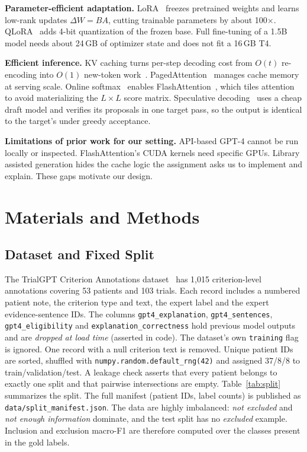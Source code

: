 \documentclass[conference]{IEEEtran}
\begin{document}
\textbf{Parameter-efficient adaptation.} LoRA~\cite{hu2022lora} freezes pretrained weights and learns
low-rank updates $\Delta W=BA$, cutting trainable parameters by about 100$\times$. QLoRA~\cite{dettmers2023qlora}
adds 4-bit quantization of the frozen base. Full fine-tuning of a 1.5B model needs about 24\,GB of optimizer
state and does not fit a 16\,GB T4.

\textbf{Efficient inference.} KV caching turns per-step decoding cost from $O(t)$ re-encoding into
$O(1)$ new-token work~\cite{pope2023efficiently}. PagedAttention~\cite{kwon2023vllm} manages cache memory at
serving scale. Online softmax~\cite{milakov2018online} enables FlashAttention~\cite{dao2022flashattention},
which tiles attention to avoid materializing the $L\times L$ score matrix. Speculative
decoding~\cite{leviathan2023fast,chen2023accelerating} uses a cheap draft model and verifies its proposals in one
target pass, so the output is identical to the target's under greedy acceptance.

\textbf{Limitations of prior work for our setting.} API-based GPT-4 cannot be run locally or
inspected. FlashAttention's CUDA kernels need specific GPUs. Library assisted generation hides the
cache logic the assignment asks us to implement and explain. These gaps motivate our design.

\section{Materials and Methods}
\subsection{Dataset and Fixed Split}
The TrialGPT Criterion Annotations dataset~\cite{jin2024trialgpt} has 1,015 criterion-level
annotations covering 53 patients and 103 trials. Each record includes a numbered patient note,
the criterion type and text, the expert label and the expert evidence-sentence IDs. The
columns \texttt{gpt4\_explanation}, \texttt{gpt4\_sentences}, \texttt{gpt4\_eligibility} and
\texttt{explanation\_correctness} hold previous model outputs and are \emph{dropped at load
time} (asserted in code). The dataset's own \texttt{training} flag is ignored. One record with a null
criterion text is removed. Unique patient IDs are sorted, shuffled with
\texttt{numpy.random.default\_rng(42)} and assigned 37/8/8 to train/validation/test. A leakage check
asserts that every patient belongs to exactly one split and that pairwise intersections are empty.
Table~\ref{tab:split} summarizes the split. The full manifest (patient IDs, label counts) is
published as \texttt{data/split\_manifest.json}. The data are highly imbalanced: \emph{not excluded}
and \emph{not enough information} dominate, and the test split has no \emph{excluded} example. Inclusion
and exclusion macro-F1 are therefore computed over the classes present in the gold labels.
\end{document}
